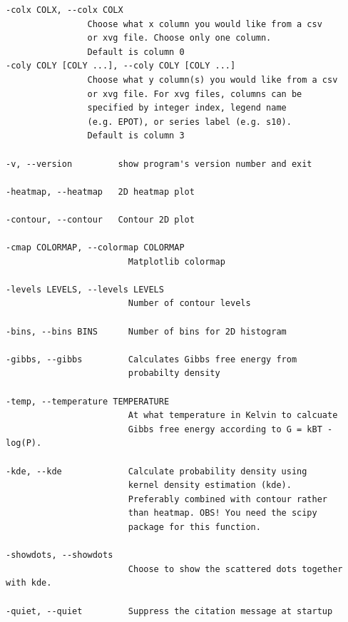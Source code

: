 \begin{verbatim}
-colx COLX, --colx COLX
                Choose what x column you would like from a csv 
                or xvg file. Choose only one column. 
                Default is column 0
-coly COLY [COLY ...], --coly COLY [COLY ...]
                Choose what y column(s) you would like from a csv 
                or xvg file. For xvg files, columns can be 
                specified by integer index, legend name 
                (e.g. EPOT), or series label (e.g. s10). 
                Default is column 3

-v, --version         show program's version number and exit

-heatmap, --heatmap   2D heatmap plot

-contour, --contour   Contour 2D plot

-cmap COLORMAP, --colormap COLORMAP
                        Matplotlib colormap

-levels LEVELS, --levels LEVELS
                        Number of contour levels

-bins, --bins BINS      Number of bins for 2D histogram

-gibbs, --gibbs         Calculates Gibbs free energy from 
                        probabilty density

-temp, --temperature TEMPERATURE
                        At what temperature in Kelvin to calcuate
                        Gibbs free energy according to G = kBT - log(P).

-kde, --kde             Calculate probability density using 
                        kernel density estimation (kde). 
                        Preferably combined with contour rather 
                        than heatmap. OBS! You need the scipy 
                        package for this function.

-showdots, --showdots
                        Choose to show the scattered dots together with kde.

-quiet, --quiet         Suppress the citation message at startup
\end{verbatim}

